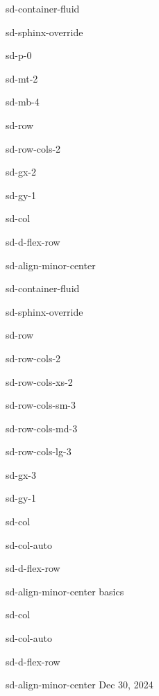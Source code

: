 \documentclass[letterpaper,10pt,english]{jupyterBook}
\begin{document}
\begin{sphinxuseclass}{sd-container-fluid}
\begin{sphinxuseclass}{sd-sphinx-override}
\begin{sphinxuseclass}{sd-p-0}
\begin{sphinxuseclass}{sd-mt-2}
\begin{sphinxuseclass}{sd-mb-4}
\begin{sphinxuseclass}{sd-row}
\begin{sphinxuseclass}{sd-row-cols-2}
\begin{sphinxuseclass}{sd-gx-2}
\begin{sphinxuseclass}{sd-gy-1}
\begin{sphinxuseclass}{sd-col}
\begin{sphinxuseclass}{sd-d-flex-row}
\begin{sphinxuseclass}{sd-align-minor-center}
\begin{sphinxuseclass}{sd-container-fluid}
\begin{sphinxuseclass}{sd-sphinx-override}
\begin{sphinxuseclass}{sd-row}
\begin{sphinxuseclass}{sd-row-cols-2}
\begin{sphinxuseclass}{sd-row-cols-xs-2}
\begin{sphinxuseclass}{sd-row-cols-sm-3}
\begin{sphinxuseclass}{sd-row-cols-md-3}
\begin{sphinxuseclass}{sd-row-cols-lg-3}
\begin{sphinxuseclass}{sd-gx-3}
\begin{sphinxuseclass}{sd-gy-1}
\begin{sphinxuseclass}{sd-col}
\begin{sphinxuseclass}{sd-col-auto}
\begin{sphinxuseclass}{sd-d-flex-row}
\begin{sphinxuseclass}{sd-align-minor-center}
\sphinxAtStartPar
basics

\end{sphinxuseclass}
\end{sphinxuseclass}
\end{sphinxuseclass}
\end{sphinxuseclass}
\begin{sphinxuseclass}{sd-col}
\begin{sphinxuseclass}{sd-col-auto}
\begin{sphinxuseclass}{sd-d-flex-row}
\begin{sphinxuseclass}{sd-align-minor-center}
\sphinxAtStartPar
Dec 30, 2024


\end{sphinxuseclass}
\end{sphinxuseclass}
\end{sphinxuseclass}
\end{sphinxuseclass}
\end{sphinxuseclass}
\end{sphinxuseclass}
\end{sphinxuseclass}
\end{sphinxuseclass}
\end{sphinxuseclass}
\end{sphinxuseclass}
\end{sphinxuseclass}
\end{sphinxuseclass}
\end{sphinxuseclass}
\end{sphinxuseclass}
\end{sphinxuseclass}
\end{sphinxuseclass}
\end{sphinxuseclass}
\end{sphinxuseclass}
\end{sphinxuseclass}
\end{sphinxuseclass}
\end{sphinxuseclass}
\end{sphinxuseclass}
\end{sphinxuseclass}
\end{sphinxuseclass}
\end{sphinxuseclass}
\end{sphinxuseclass}
\end{document}
